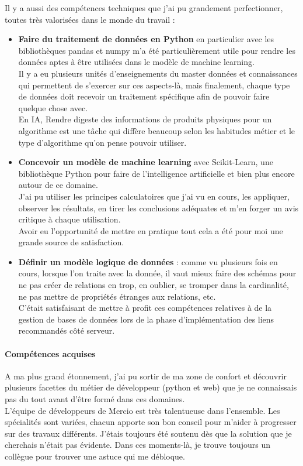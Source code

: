 \documentclass{rapportCS}
\begin{document}
Il y a aussi des compétences techniques que j'ai pu grandement perfectionner, toutes
très valorisées dans le monde du travail :
\begin{itemize}
  \item \textbf{Faire du traitement de données en Python} en particulier avec les 
  bibliothèques pandas et numpy m'a été particulièrement utile pour rendre les données
  aptes à être utilisées dans le modèle de machine learning.\\
  Il y a eu plusieurs unités d'enseignements du master données et connaissances qui permettent
  de s'exercer sur ces aspects-là, mais finalement, chaque type de données doit recevoir un
  traitement spécifique afin de pouvoir faire quelque chose avec.\\
  En IA, Rendre digeste des informations de produits physiques pour un algorithme est une tâche
  qui diffère beaucoup selon les habitudes métier et le type d'algorithme qu'on pense pouvoir
  utiliser.
  \item \textbf{Concevoir un modèle de machine learning} avec Scikit-Learn, une bibliothèque
  Python pour faire de l'intelligence artificielle et bien plus encore autour de ce domaine.\\
  J'ai pu utiliser les principes calculatoires que j'ai vu en cours, les appliquer, observer les
  résultats, en tirer les conclusions adéquates et m'en forger un avis critique à chaque utilisation.\\
  Avoir eu l'opportunité de mettre en pratique tout cela a été pour moi une grande source de
  satisfaction. 
  \item \textbf{Définir un modèle logique de données} : comme vu plusieurs fois en cours, 
  lorsque l'on traite avec la donnée, il vaut mieux faire des schémas pour ne pas créer
  de relations en trop, en oublier, se tromper dans la cardinalité, ne pas
  mettre de propriétés étranges aux relations, etc.\\
  C'était satisfaisant de mettre à profit ces compétences relatives à de la gestion
  de bases de données lors de la phase d'implémentation des liens recommandés côté 
  serveur.

\end{itemize}

\paragraph{Compétences acquises}
A ma plus grand étonnement, j'ai pu sortir de ma zone de confort et découvrir plusieurs
facettes du métier de développeur (python et web) que je ne connaissais pas du tout avant
d'être formé dans ces domaines.\\
L'équipe de développeurs de Mercio est très talentueuse dans l'ensemble. Les spécialités
sont variées, chacun apporte son bon conseil pour m'aider à progresser sur des travaux différents.
J'étais toujours été soutenu dès que la solution que je cherchais n'était pas évidente.
Dans ces moments-là, je trouve toujours un collègue pour trouver une astuce qui me débloque.\\
\end{document}
